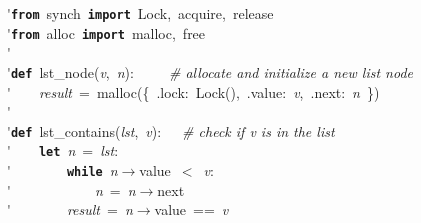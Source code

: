 \'\>\texttt{\textbf{from}}~synch~\texttt{\textbf{import}}~Lock,~acquire,~release\\

\'\>\texttt{\textbf{from}}~alloc~\texttt{\textbf{import}}~malloc,~free\\

\'\>\\

\'\>\texttt{\textbf{def}}~lst\_node(\textit{v},~\textit{n}):~~~~~\emph{\# allocate and initialize a new list node}\\

\'\>~~~~\textit{result}~=~malloc(\{~.lock:~Lock(),~.value:~\textit{v},~.next:~\textit{n}~\})\\

\'\>\\

\'\>\texttt{\textbf{def}}~lst\_contains(\textit{lst},~\textit{v}):~~~\emph{\# check if v is in the list}\\

\'\>~~~~\texttt{\textbf{let}}~\textit{n}~=~\textit{lst}:\\

\'\>~~~~~~~~\texttt{\textbf{while}}~\textit{n}$\rightarrow$value~$<$~\textit{v}:\\

\'\>~~~~~~~~~~~~\textit{n}~=~\textit{n}$\rightarrow$next\\

\'\>~~~~~~~~\textit{result}~=~\textit{n}$\rightarrow$value~==~\textit{v}